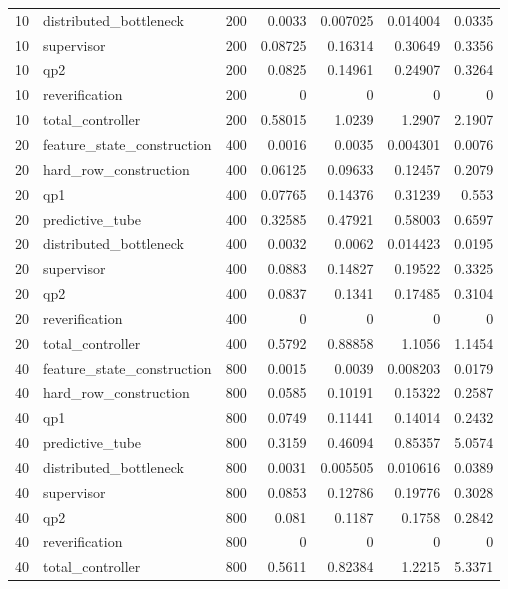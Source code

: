 \begin{table}[!t]
\begin{tabular}{rlrrrrr}
10 & distributed\_bottleneck & 200 & 0.0033 & 0.007025 & 0.014004 & 0.0335 \\
10 & supervisor & 200 & 0.08725 & 0.16314 & 0.30649 & 0.3356 \\
10 & qp2 & 200 & 0.0825 & 0.14961 & 0.24907 & 0.3264 \\
10 & reverification & 200 & 0 & 0 & 0 & 0 \\
10 & total\_controller & 200 & 0.58015 & 1.0239 & 1.2907 & 2.1907 \\
20 & feature\_state\_construction & 400 & 0.0016 & 0.0035 & 0.004301 & 0.0076 \\
20 & hard\_row\_construction & 400 & 0.06125 & 0.09633 & 0.12457 & 0.2079 \\
20 & qp1 & 400 & 0.07765 & 0.14376 & 0.31239 & 0.553 \\
20 & predictive\_tube & 400 & 0.32585 & 0.47921 & 0.58003 & 0.6597 \\
20 & distributed\_bottleneck & 400 & 0.0032 & 0.0062 & 0.014423 & 0.0195 \\
20 & supervisor & 400 & 0.0883 & 0.14827 & 0.19522 & 0.3325 \\
20 & qp2 & 400 & 0.0837 & 0.1341 & 0.17485 & 0.3104 \\
20 & reverification & 400 & 0 & 0 & 0 & 0 \\
20 & total\_controller & 400 & 0.5792 & 0.88858 & 1.1056 & 1.1454 \\
40 & feature\_state\_construction & 800 & 0.0015 & 0.0039 & 0.008203 & 0.0179 \\
40 & hard\_row\_construction & 800 & 0.0585 & 0.10191 & 0.15322 & 0.2587 \\
40 & qp1 & 800 & 0.0749 & 0.11441 & 0.14014 & 0.2432 \\
40 & predictive\_tube & 800 & 0.3159 & 0.46094 & 0.85357 & 5.0574 \\
40 & distributed\_bottleneck & 800 & 0.0031 & 0.005505 & 0.010616 & 0.0389 \\
40 & supervisor & 800 & 0.0853 & 0.12786 & 0.19776 & 0.3028 \\
40 & qp2 & 800 & 0.081 & 0.1187 & 0.1758 & 0.2842 \\
40 & reverification & 800 & 0 & 0 & 0 & 0 \\
40 & total\_controller & 800 & 0.5611 & 0.82384 & 1.2215 & 5.3371 \\
\hline
\end{tabular}
\end{table}
